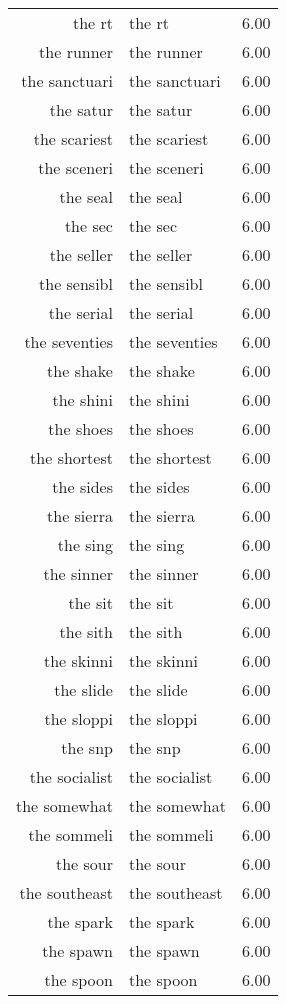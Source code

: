 \begin{table}[ht]
\begin{tabular}{rlr}
  the rt & the rt & 6.00 \\ 
  the runner & the runner & 6.00 \\ 
  the sanctuari & the sanctuari & 6.00 \\ 
  the satur & the satur & 6.00 \\ 
  the scariest & the scariest & 6.00 \\ 
  the sceneri & the sceneri & 6.00 \\ 
  the seal & the seal & 6.00 \\ 
  the sec & the sec & 6.00 \\ 
  the seller & the seller & 6.00 \\ 
  the sensibl & the sensibl & 6.00 \\ 
  the serial & the serial & 6.00 \\ 
  the seventies & the seventies & 6.00 \\ 
  the shake & the shake & 6.00 \\ 
  the shini & the shini & 6.00 \\ 
  the shoes & the shoes & 6.00 \\ 
  the shortest & the shortest & 6.00 \\ 
  the sides & the sides & 6.00 \\ 
  the sierra & the sierra & 6.00 \\ 
  the sing & the sing & 6.00 \\ 
  the sinner & the sinner & 6.00 \\ 
  the sit & the sit & 6.00 \\ 
  the sith & the sith & 6.00 \\ 
  the skinni & the skinni & 6.00 \\ 
  the slide & the slide & 6.00 \\ 
  the sloppi & the sloppi & 6.00 \\ 
  the snp & the snp & 6.00 \\ 
  the socialist & the socialist & 6.00 \\ 
  the somewhat & the somewhat & 6.00 \\ 
  the sommeli & the sommeli & 6.00 \\ 
  the sour & the sour & 6.00 \\ 
  the southeast & the southeast & 6.00 \\ 
  the spark & the spark & 6.00 \\ 
  the spawn & the spawn & 6.00 \\ 
  the spoon & the spoon & 6.00 \\ 

\end{tabular}
\end{table}

